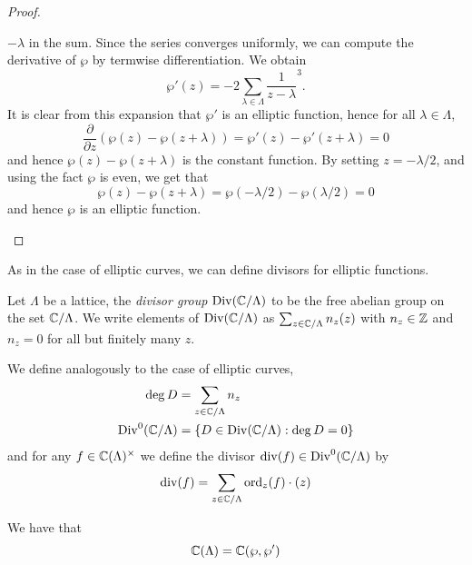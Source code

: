 \begin{proof}
\begin{enumerate}[label=(\alph*)]
		$-\lambda$ in the sum. Since the series converges uniformly,
		we can compute the derivative of $\wp$ by termwise differentiation.
		We obtain
		\begin{equation*}
			\wp'(z) = -2\sum_{\lambda \in \Lambda} \frac{1}{z - \lambda}^3.
		\end{equation*}
		It is clear from this expansion that $\wp'$ is an elliptic function,
		hence for all $\lambda \in \Lambda$,
		\begin{equation*}
			\frac{\partial}{\partial z}(\wp(z) - \wp(z + \lambda))
			= \wp'(z) - \wp'(z + \lambda) = 0
		\end{equation*}
		and hence $\wp(z) - \wp(z + \lambda)$ is the constant function.
		By setting $z = -\lambda/2$, and using the fact $\wp$ is even,
		we get that
		\begin{equation*}
			\wp(z) - \wp(z + \lambda) = \wp(-\lambda/2) - \wp(\lambda/2) = 0
		\end{equation*}
		and hence $\wp$ is an elliptic function.
	\end{enumerate}
\end{proof}

As in the case of elliptic curves, we can define divisors for elliptic
functions.
\begin{definition}
	Let $\Lambda$ be a lattice, the \emph{divisor group}
	$\operatorname{Div}(\mathbb{C}/\Lambda)$ to be the free abelian group on the set
	$\mathbb{C}/\Lambda$. We write elements of $\operatorname{Div}(\mathbb{C}/\Lambda)$ as
	$\sum_{z \in\mathbb{C}/\Lambda} n_z(z)$ with $n_z \in \mathbb{Z}$ and
	$n_z = 0$ for all but finitely many $z$.

	We define analogously to the case of elliptic curves,
	\begin{align*}
		\deg D &= \sum_{z \in \mathbb{C}/\Lambda} n_z\\
		\operatorname{Div}^0(\mathbb{C}/\Lambda) &= \{D \in \operatorname{Div}(\mathbb{C}/\Lambda): \deg D = 0\}
	\end{align*}
	and for any $f \in \mathbb{C}(\Lambda)^\times$ we define the divisor
	$\operatorname{div}(f) \in \operatorname{Div}^0(\mathbb{C}/\Lambda)$ by
	\begin{equation*}
		\operatorname{div}(f) = \sum_{z \in \mathbb{C}/\Lambda} \operatorname{ord}_z(f)\cdot(z)
	\end{equation*}
\end{definition}

\begin{theorem}
	\label{thm:wp-generates}
	We have that
	\begin{equation*}
		\mathbb{C}(\Lambda) = \mathbb{C}(\wp, \wp')
	\end{equation*}
\end{theorem}

